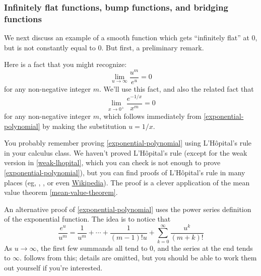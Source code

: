 \subsubsection*{Infinitely flat functions, bump functions, and bridging functions}

We next discuss an example of a smooth function which gets ``infinitely flat'' at 0, but is not constantly equal to 0. But first, a preliminary remark. 

\begin{remark} \label{exponential-limit}
	Here is a fact that you might recognize:
	\begin{equation} \label{exponential-polynomial} \lim_{u \to \infty} \frac{u^m}{e^u} = 0 \end{equation}
	for any non-negative integer $m$. We'll use this fact, and also the related fact that
	\[ \lim_{x \to 0^+} \frac{e^{-1/x}}{x^m} = 0 \]
	for any non-negative integer $m$, which follows immediately from \cref{exponential-polynomial} by making the substitution $u = 1/x$.
	
	You probably remember proving \cref{exponential-polynomial} using L'H\^{o}pital's rule in your calculus class. We haven't proved  L'H\^{o}pital's rule (except for the weak version in \cref{weak-lhopital}, which you can check is not enough to prove \cref{exponential-polynomial}), but you can find proofs of L'H\^opital's rule in many places (eg, \cite[theorem 4.15]{protter-morrey}, \cite[theorem 5.13]{rudin}, or even \href{https://en.wikipedia.org/wiki/L\%27hopital\%27s_rule}{Wikipedia}). The proof is a clever application of the mean value theorem \ref{mean-value-theorem}. 
	
	An alternative proof of \cref{exponential-polynomial} uses the power series definition of the exponential function. The idea is to notice that
	\[ \frac{e^u}{u^m} = \frac{1}{u^m} + \dotsb + \frac{1}{(m-1)!u} + \sum_{k = 0}^\infty \frac{u^k}{(m+k)!} \]
	As $u \to \infty$, the first few summands all tend to 0, and the series at the end tends to $\infty$.  follows from this; details are omitted, but you should be able to work them out yourself if you're interested.
\end{remark} 

